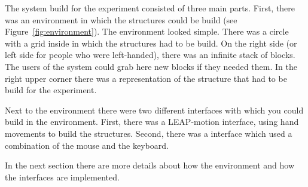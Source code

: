 
The system build for the experiment consisted of three main parts. First, there was an environment in which the structures could be build (see Figure~\ref{fig:environment}). The environment looked simple. There was a circle with a grid inside in which the structures had to be build. On the right side (or left side for people who were left-handed), there was an infinite stack of blocks. The users of the system could grab here new blocks if they needed them. In the right upper corner there was a representation of the structure that had to be build for the experiment.

Next to the environment there were two different interfaces with which you could build in the environment. First, there was a LEAP-motion interface, using hand movements to build the structures. Second, there was a interface which used a combination of the mouse and the keyboard.

In the next section there are more details about how the environment and how the interfaces are implemented.

